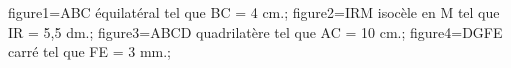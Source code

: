 \documentclass[exercice]{thedocument}%
\begin{document}
%
    \>figure1=ABC équilatéral tel que BC = 4 cm.;%
    \>figure2=IRM isocèle en M tel que IR = 5,5 dm.;%
    \>figure3=ABCD quadrilatère tel que AC = 10 cm.;%
    \>figure4=DGFE carré tel que FE = 3 mm.;%
\end{document}
